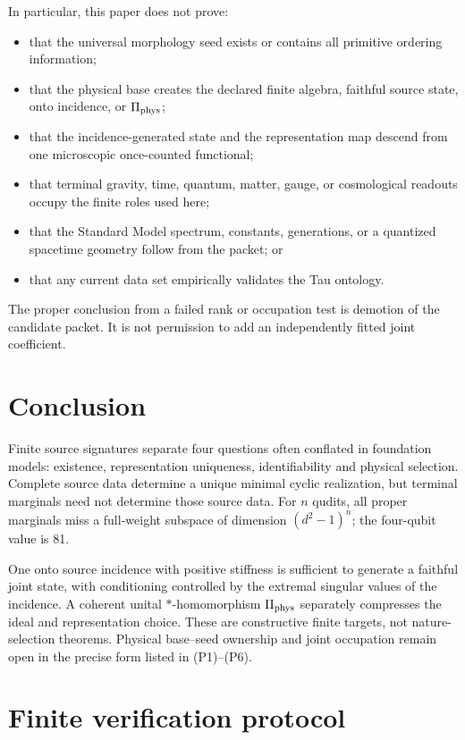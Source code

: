 \documentclass[11pt]{article}
\begin{document}
In particular, this paper does not prove:
\begin{itemize}
 \item that the universal morphology seed exists or contains all primitive
 ordering information;
 \item that the physical base creates the declared finite algebra, faithful
 source state, onto incidence, or \(\Pi_{\rm phys}\);
 \item that the incidence-generated state and the representation map descend
 from one microscopic once-counted functional;
 \item that terminal gravity, time, quantum, matter, gauge, or cosmological
 readouts occupy the finite roles used here;
 \item that the Standard Model spectrum, constants, generations, or a
 quantized spacetime geometry follow from the packet; or
 \item that any current data set empirically validates the Tau ontology.
\end{itemize}

The proper conclusion from a failed rank or occupation test is demotion of the
candidate packet.  It is not permission to add an independently fitted joint
coefficient.

\section{Conclusion}

Finite source signatures separate four questions often conflated in
foundation models: existence, representation uniqueness, identifiability and
physical selection.  Complete source data determine a unique minimal cyclic
realization, but terminal marginals need not determine those source data.  For
\(n\) qudits, all proper marginals miss a full-weight subspace of dimension
\((d^2-1)^n\); the four-qubit value is 81.

One onto source incidence with positive stiffness is sufficient to generate a
faithful joint state, with conditioning controlled by the extremal singular
values of the incidence.  A coherent unital \(*\)-homomorphism
\(\Pi_{\rm phys}\) separately compresses the ideal and representation choice.
These are constructive finite targets, not nature-selection theorems.
Physical base--seed ownership and joint occupation remain open in the precise
form listed in (P1)--(P6).

\appendix
\section{Finite verification protocol}
\end{document}
